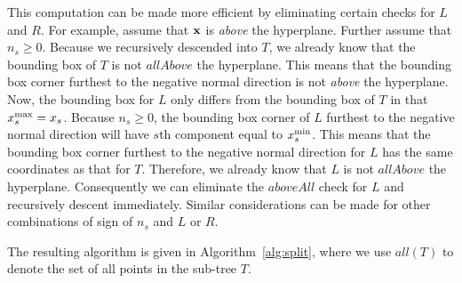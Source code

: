 This computation can be made more efficient by eliminating certain checks for $L$ and $R$.
For example, assume that $\mathbf{x}$ is \emph{above} the hyperplane.
Further assume that $n_s \geq 0$.
Because we recursively descended into $T$, we already know that the bounding box of $T$ is not $\mathit{allAbove}$ the hyperplane.
This means that the bounding box corner furthest to the negative normal direction is not \emph{above} the hyperplane.
Now, the bounding box for $L$ only differs from the bounding box of $T$ in that $x^{\operatorname{max}}_{s} = x_s$.
Because $n_s \geq 0$, the bounding box corner of $L$ furthest to the negative normal direction will have $s$th component equal to $x^{\operatorname{min}}_{s}$.
This means that the bounding box corner furthest to the negative normal direction for $L$ has the same coordinates as that for $T$.
Therefore, we already know that $L$ is not $\mathit{allAbove}$ the hyperplane.
Consequently we can eliminate the $\mathit{aboveAll}$ check for $L$ and recursively descent immediately.
Similar considerations can be made for other combinations of sign of $n_s$ and $L$ or $R$.

The resulting algorithm is given in Algorithm~\ref{alg:split},
  where we use $\mathit{all}\left(T\right)$ to denote the set of all points in the sub-tree $T$.


